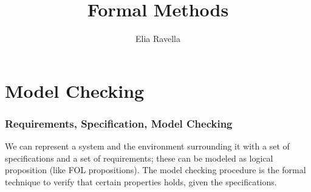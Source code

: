 \documentclass{article}
\title{Formal Methods}
\author{Elia Ravella}
\begin{document}
	\begin{titlepage}
		\maketitle
	\end{titlepage}
	
	\tableofcontents
	\clearpage
	
	\part{Model Checking}
		\section{Requirements, Specification, Model Checking}
			We can represent a system and the environment surrounding it with a set of specifications and a set of requirements; these can be modeled as logical proposition (like FOL propositions). The model checking procedure is the formal technique to verify that certain properties holds, given the specifications.
		
\end{document}
